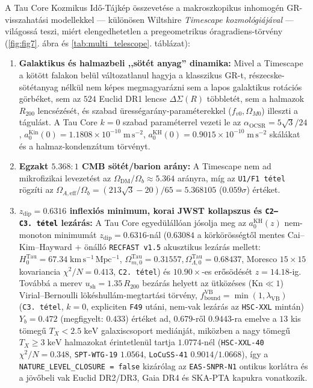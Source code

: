 \documentclass[11pt,a4paper]{article}
\begin{document}
A Tau Core Kozmikus Idő-Tájkép összevetése a makroszkopikus inhomogén GR-visszahatási modellekkel --- különösen Wiltshire \emph{Timescape kozmológiájával} \cite{Wiltshire2007Timescape} --- világossá teszi, miért elengedhetetlen a pregeometrikus óragradiens-törvény (\ref{fig:fig7}. ábra és \ref{tab:multi_telescope}. táblázat):
\begin{enumerate}
  \item \textbf{Galaktikus és halmazbeli ,,sötét anyag'' dinamika:} Mivel a Timescape a kötött falakon belül változatlanul hagyja a klasszikus GR-t, részecske-sötétanyag nélkül nem képes megmagyarázni sem a lapos galaktikus rotációs görbéket, sem az $524$ Euclid DR1 lencse $\Delta\Sigma(R)$ többletét, sem a halmazok $R_{200}$ lencsézését, és szabad ürességarány-paraméterekkel ($f_{v0}, \Omega_{M0}$) illeszti a tágulást. A Tau Core $k = 0$ szabad paraméterrel vezeti le az $\alpha_{\mathrm{OCSR}} = 5\sqrt{3}/24$, $a_0^{\mathrm{Kin}}(0) = 1.1808\times 10^{-10}\;\mathrm{m\,s^{-2}}$, $a_0^{\mathrm{KH}}(0) = 0.9015\times 10^{-10}\;\mathrm{m\,s^{-2}}$ skálákat és a halmaz-kondenzátum törvényt.
  \item \textbf{Egzakt $5.368:1$ CMB sötét/barion arány:} A Timescape nem ad mikrofizikai levezetést az $\Omega_{\mathrm{DM}}/\Omega_b \approx 5.364$ arányra, míg az \texttt{U1/F1 tétel} rögzíti az $\Omega_{A,\mathrm{eff}}/\Omega_b = (213\sqrt{3}-20)/65 = 5.368105$ ($0.059\sigma$) értéket.
  \item \textbf{$z_{\mathrm{dip}} = 0.6316$ inflexiós minimum, korai JWST kollapszus és \texttt{C2--C3.\ tétel} lezárás:} A Tau Core egyedülállóan jósolja meg az $a_0^{\mathrm{KH}}(z)$ nem-monoton minimumát $z_{\mathrm{dip}} = 0.6316$-nál ($0.63084$ a körkörösségtől mentes Cai--Kim--Hayward + önálló \texttt{RECFAST v1.5} akusztikus lezárás mellett: $H_0^{\mathrm{Tau}} = 67.34\;\mathrm{km\,s^{-1}\,Mpc^{-1}}$, $\Omega_{m,0}^{\mathrm{Tau}} = 0.31557, \Omega_{\Lambda,0}^{\mathrm{Tau}} = 0.68437$, Moresco $15\times 15$ kovariancia $\chi^2/N = 0.413$, \texttt{C2.\ tétel}) és $10.90\times$-es erősödését $z = 14.18$-ig. Továbbá a merev $u_{\mathrm{sh}} = 1.35\,R_{200}$ bezárás helyett az ütközéses ($\mathrm{Kn} \ll 1$) Virial--Bernoulli lökéshullám-megtartási törvény, $f_{\mathrm{bound}}^{\mathrm{VB}} = \min(1, \lambda_{\mathrm{VB}})$ (\texttt{C3.\ tétel}, $k = 0$, expliciten \texttt{F49} utáni, nem-vak lezárás az \texttt{HSC-XXL} mintán) $Y_b = 0.472$ (megfigyelt: $0.433$) értéket ad, $0.679$-ről $\mathbf{0.9443}$-ra emelve a $13$ kis tömegű $T_X < 2.5\;\mathrm{keV}$ galaxiscsoport mediánját, miközben a nagy tömegű $T_X \ge 3\;\mathrm{keV}$ halmazokat érintetlenül tartja $\mathbf{1.0774}$-nél (\texttt{HSC-XXL-40} $\chi^2/N = \mathbf{0.348}$, \texttt{SPT-WTG-19} $1.0564$, \texttt{LoCuSS-41} $0.9014/1.0668$), így a \texttt{NATURE\_LEVEL\_CLOSURE = false} kizárólag az \texttt{EAS-SNPR-N1} ontikus korlátra és a jövőbeli vak Euclid DR2/DR3, Gaia DR4 és SKA-PTA kapukra vonatkozik.
\end{enumerate}
\end{document}
